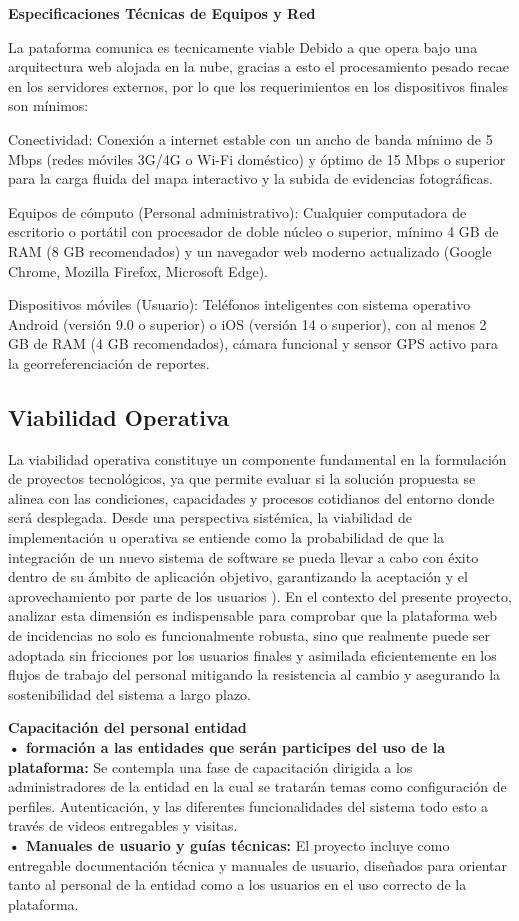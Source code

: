 \textbf{Especificaciones Técnicas de Equipos y Red}

La pataforma comunica es tecnicamente viable Debido a que opera bajo una arquitectura web alojada en la nube, gracias a esto el procesamiento pesado recae en los servidores externos, por lo que los requerimientos en los dispositivos finales son mínimos:

Conectividad: Conexión a internet estable con un ancho de banda mínimo de 5 Mbps (redes móviles 3G/4G o Wi-Fi doméstico) y óptimo de 15 Mbps o superior para la carga fluida del mapa interactivo y la subida de evidencias fotográficas.

Equipos de cómputo (Personal administrativo): Cualquier computadora de escritorio o portátil con procesador de doble núcleo o superior, mínimo 4 GB de RAM (8 GB recomendados) y un navegador web moderno actualizado (Google Chrome, Mozilla Firefox, Microsoft Edge).

Dispositivos móviles (Usuario): Teléfonos inteligentes con sistema operativo Android (versión 9.0 o superior) o iOS (versión 14 o superior), con al menos 2 GB de RAM (4 GB recomendados), cámara funcional y sensor GPS activo para la georreferenciación de reportes.


\subsection{Viabilidad Operativa}
\label{subsec:operativa}

La viabilidad operativa constituye un componente fundamental en la formulación de proyectos tecnológicos, ya que permite evaluar si la solución propuesta se alinea con las condiciones, capacidades y procesos cotidianos del entorno donde será desplegada. Desde una perspectiva sistémica, la viabilidad de implementación u operativa se entiende como la probabilidad de que la integración de un nuevo sistema de software se pueda llevar a cabo con éxito dentro de su ámbito de aplicación objetivo, garantizando la aceptación y el aprovechamiento por parte de los usuarios \parencite{ReyesGarcia2024}). En el contexto del presente proyecto, analizar esta dimensión es indispensable para comprobar que la plataforma web de incidencias no solo es funcionalmente robusta, sino que realmente puede ser adoptada sin fricciones por los usuarios finales y asimilada eficientemente en los flujos de trabajo del personal mitigando la resistencia al cambio y asegurando la sostenibilidad del sistema a largo plazo.

\textbf{Capacitación del personal entidad}\\
\textbf{• formación a las entidades que serán participes del uso de la plataforma:} Se contempla una fase de capacitación dirigida a los administradores de la entidad en la cual se tratarán temas como configuración de perfiles. Autenticación, y las diferentes funcionalidades del sistema todo esto a través de videos entregables y visitas.\\
\textbf{• Manuales de usuario y guías técnicas:} El proyecto incluye como entregable documentación técnica y manuales de usuario, diseñados para orientar tanto al personal de la entidad como a los usuarios en el uso correcto de la plataforma.

